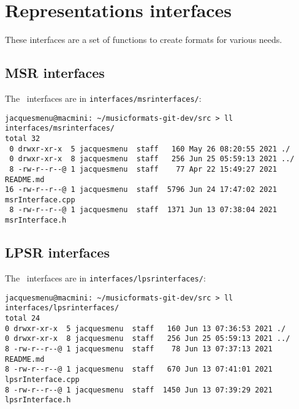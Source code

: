 
\chapter{Representations interfaces}

These interfaces are a set of functions to create formats for various needs.


\section{MSR interfaces}

The \msrRepr\ interfaces are in {\tt interfaces/msrinterfaces/}:
\begin{lstlisting}[language=Terminal]
jacquesmenu@macmini: ~/musicformats-git-dev/src > ll interfaces/msrinterfaces/
total 32
 0 drwxr-xr-x  5 jacquesmenu  staff   160 May 26 08:20:55 2021 ./
 0 drwxr-xr-x  8 jacquesmenu  staff   256 Jun 25 05:59:13 2021 ../
 8 -rw-r--r--@ 1 jacquesmenu  staff    77 Apr 22 15:49:27 2021 README.md
16 -rw-r--r--@ 1 jacquesmenu  staff  5796 Jun 24 17:47:02 2021 msrInterface.cpp
 8 -rw-r--r--@ 1 jacquesmenu  staff  1371 Jun 13 07:38:04 2021 msrInterface.h
\end{lstlisting}


\section{LPSR interfaces}

The \lpsrRepr\ interfaces are in {\tt interfaces/lpsrinterfaces/}:
\begin{lstlisting}[language=Terminal]
jacquesmenu@macmini: ~/musicformats-git-dev/src > ll interfaces/lpsrinterfaces/
total 24
0 drwxr-xr-x  5 jacquesmenu  staff   160 Jun 13 07:36:53 2021 ./
0 drwxr-xr-x  8 jacquesmenu  staff   256 Jun 25 05:59:13 2021 ../
8 -rw-r--r--@ 1 jacquesmenu  staff    78 Jun 13 07:37:13 2021 README.md
8 -rw-r--r--@ 1 jacquesmenu  staff   670 Jun 13 07:41:01 2021 lpsrInterface.cpp
8 -rw-r--r--@ 1 jacquesmenu  staff  1450 Jun 13 07:39:29 2021 lpsrInterface.h
\end{lstlisting}


